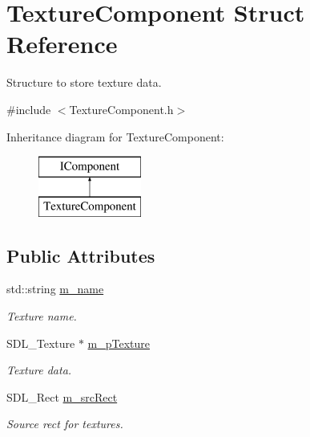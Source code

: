 \hypertarget{struct_texture_component}{}\section{Texture\+Component Struct Reference}
\label{struct_texture_component}


Structure to store texture data.  




{\ttfamily \#include $<$Texture\+Component.\+h$>$}

Inheritance diagram for Texture\+Component\+:\begin{figure}[H]
\begin{center}
\leavevmode
\includegraphics[height=2.000000cm]{struct_texture_component}
\end{center}
\end{figure}
\subsection*{Public Attributes}
\begin{DoxyCompactItemize}
\item 
\mbox{\label{struct_texture_component_acb41794a83d0a9b43015e8c979bc988c}} 
std\+::string \mbox{\hyperlink{struct_texture_component_acb41794a83d0a9b43015e8c979bc988c}{m\+\_\+name}}
\begin{DoxyCompactList}\small\item\em Texture name. \end{DoxyCompactList}\item 
\mbox{\label{struct_texture_component_a7ed9b861446b42f3fa02532e2af227a0}} 
S\+D\+L\+\_\+\+Texture $\ast$ \mbox{\hyperlink{struct_texture_component_a7ed9b861446b42f3fa02532e2af227a0}{m\+\_\+p\+Texture}}
\begin{DoxyCompactList}\small\item\em Texture data. \end{DoxyCompactList}\item 
\mbox{\label{struct_texture_component_ab490306423d90975c8dae0ef565bd60a}} 
S\+D\+L\+\_\+\+Rect \mbox{\hyperlink{struct_texture_component_ab490306423d90975c8dae0ef565bd60a}{m\+\_\+src\+Rect}}
\begin{DoxyCompactList}\small\item\em Source rect for textures. \end{DoxyCompactList}\end{DoxyCompactItemize}
